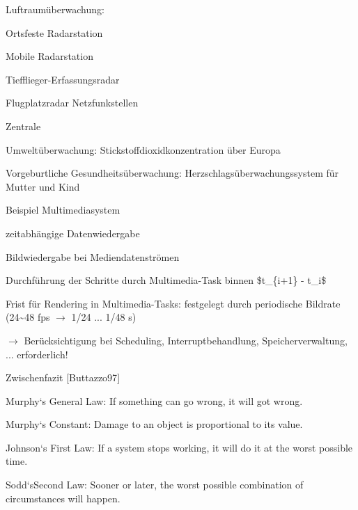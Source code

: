 \documentclass[a4paper]{article}
\begin{document}
\begin{multicols}{3}
    \begin{itemize*}
        \item
        Luftraumüberwachung:
        \begin{itemize*}
            \item Ortsfeste Radarstation
            \item Mobile Radarstation
            \item Tiefflieger-Erfassungsradar
            \item Flugplatzradar Netzfunkstellen
            \item Zentrale
        \end{itemize*}
        \item
        Umweltüberwachung: Stickstoffdioxidkonzentration über Europa
        \item
        Vorgeburtliche Gesundheitsüberwachung: Herzschlagsüberwachungssystem
        für Mutter und Kind
    \end{itemize*}

    Beispiel Multimediasystem

    \begin{itemize*}
        \item
        zeitabhängige Datenwiedergabe
        \item
        Bildwiedergabe bei Mediendatenströmen
        \item
        Durchführung der Schritte durch Multimedia-Task binnen \$t\_\{i+1\} -
        t\_i\$
        \item
        Frist für Rendering in Multimedia-Tasks: festgelegt durch periodische
        Bildrate (24\textasciitilde48 fps $\rightarrow$ 1/24
        ... 1/48 s)
        \item
        $\rightarrow$ Berücksichtigung bei Scheduling,
        Interruptbehandlung, Speicherverwaltung, ... erforderlich!
    \end{itemize*}

    Zwischenfazit {[}Buttazzo97{]}

    \begin{itemize*}
        \item
        Murphy`s General Law: If something can go wrong, it will got wrong.
        \item
        Murphy`s Constant: Damage to an object is proportional to its value.
        \item
        Johnson`s First Law: If a system stops working, it will do it at the
        worst possible time.
        \item
        Sodd`sSecond Law: Sooner or later, the worst possible combination of
        circumstances will happen.
    \end{itemize*}


\end{multicols}
\end{document}
